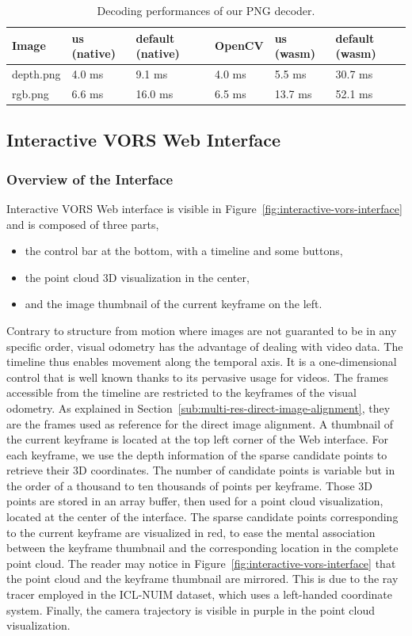 \begin{table}[ht]
\centering
\begin{tabular}{llllll}
Image & us (native) & default (native) & OpenCV & us (wasm) & default (wasm) \\
    \midrule
depth.png & 4.0 ms & 9.1 ms & 4.0 ms & 5.5 ms & 30.7 ms \\
rgb.png & 6.6 ms & 16.0 ms & 6.5 ms & 13.7 ms & 52.1 ms \\
\end{tabular}%
\caption{Decoding performances of our PNG decoder.}%
\label{tab:png-perf}
\end{table}

\subsection{Interactive VORS Web Interface}%
\label{sub:vors-web}

\subsubsection{Overview of the Interface}%

Interactive VORS Web interface is visible in Figure~\ref{fig:interactive-vors-interface}
and is composed of three parts,
\begin{itemize}
\setlength\itemsep{-0.5em}
	\item the control bar at the bottom, with a timeline and some buttons,
	\item the point cloud 3D visualization in the center,
	\item and the image thumbnail of the current keyframe on the left.
\end{itemize}
Contrary to structure from motion where images are not guaranted to be in any specific order,
visual odometry has the advantage of dealing with video data.
The timeline thus enables movement along the temporal axis.
It is a one-dimensional control that is well known thanks to its pervasive usage for videos.
The frames accessible from the timeline are restricted to the keyframes of the visual odometry.
As explained in Section~\ref{sub:multi-res-direct-image-alignment},
they are the frames used as reference for the direct image alignment.
A thumbnail of the current keyframe is located at the top left corner of the Web interface.
For each keyframe, we use the depth information of the sparse candidate points
to retrieve their 3D coordinates.
The number of candidate points is variable but in the order of a thousand
to ten thousands of points per keyframe.
Those 3D points are stored in an array buffer,
then used for a point cloud visualization,
located at the center of the interface.
The sparse candidate points corresponding to the current keyframe
are visualized in red, to ease the mental association between the keyframe thumbnail
and the corresponding location in the complete point cloud.
The reader may notice in Figure~\ref{fig:interactive-vors-interface}
that the point cloud and the keyframe thumbnail are mirrored.
This is due to the ray tracer employed in the ICL-NUIM dataset,
which uses a left-handed coordinate system.
Finally, the camera trajectory is visible in purple in the point cloud visualization.

